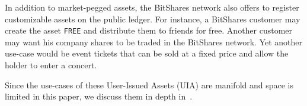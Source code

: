 In addition to market-pegged assets, the BitShares network also offers to
register customizable assets on the public ledger. For instance, a BitShares
customer may create the asset \texttt{FREE} and distribute them to friends for
free. Another customer may want his company shares to be traded in the
BitShares network. Yet another use-case would be event tickets that can be sold
at a fixed price and allow the holder to enter a concert.

Since the use-cases of these User-Issued Assets (UIA) are manifold and space is
limited in this paper, we discuss them in depth in~\cite{bts:financial}.
